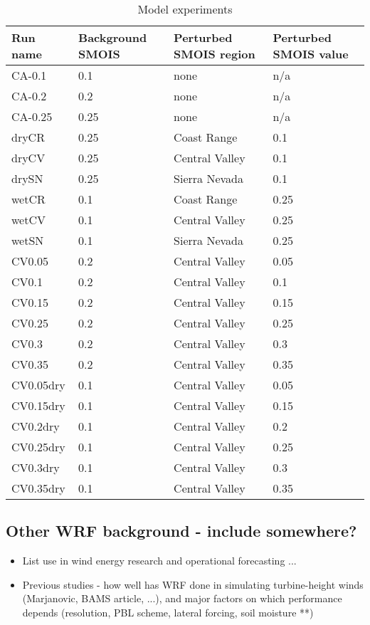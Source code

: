\begin{table}
\begin{tabular}{l l l l}
\hline
Run name & Background SMOIS & Perturbed SMOIS region & Perturbed SMOIS value \\
\hline
CA-0.1 & 0.1 & none & n/a \\
CA-0.2 & 0.2 & none & n/a \\
CA-0.25 & 0.25 & none & n/a \\
dryCR & 0.25 & Coast Range & 0.1 \\
dryCV & 0.25 & Central Valley & 0.1 \\
drySN & 0.25 & Sierra Nevada & 0.1 \\
wetCR & 0.1 & Coast Range & 0.25 \\
wetCV & 0.1 & Central Valley & 0.25 \\
wetSN & 0.1 & Sierra Nevada & 0.25 \\
CV0.05 & 0.2 & Central Valley & 0.05 \\
CV0.1 & 0.2 & Central Valley & 0.1 \\
CV0.15 & 0.2 & Central Valley & 0.15 \\
CV0.25 & 0.2 & Central Valley & 0.25 \\
CV0.3 & 0.2 & Central Valley & 0.3 \\
CV0.35 & 0.2 & Central Valley & 0.35 \\
CV0.05dry & 0.1 & Central Valley & 0.05 \\
CV0.15dry & 0.1 & Central Valley & 0.15 \\
CV0.2dry & 0.1 & Central Valley & 0.2 \\
CV0.25dry & 0.1 & Central Valley & 0.25 \\
CV0.3dry & 0.1 & Central Valley & 0.3 \\
CV0.35dry & 0.1 & Central Valley & 0.35 \\
\hline
\end{tabular}
\caption{Model experiments}
\label{table:windSol_runlist}
\end{table}




\subsection{Other WRF background - include somewhere?}

\begin{itemize}
\item List use in wind energy research and operational forecasting ...
\item Previous studies - how well has WRF done in simulating turbine-height winds (Marjanovic, BAMS article, ...), and major factors on which performance depends (resolution, PBL scheme, lateral forcing, soil moisture **)
\end{itemize}



%